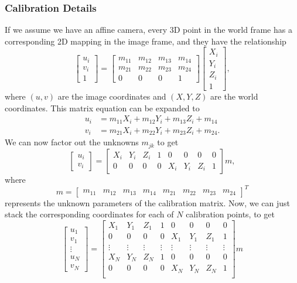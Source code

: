 \documentclass[letterpaper, 10 pt, conference]{ieeeconf}  %
\begin{document}
\subsubsection{Calibration Details}
If we assume we have an affine camera, every 3D point in the world frame has a corresponding 2D mapping in the image frame, and they have the relationship
\[
\left[\begin{array}{c}u_i \\v_i \\1\end{array}\right] =  
\left[\begin{array}{cccc}
m_{11} & m_{12} & m_{13} & m_{14} \\
m_{21} & m_{22} & m_{23} & m_{24} \\
0 & 0 & 0 & 1\end{array}\right]
\left[\begin{array}{c}X_i\\Y_i\\Z_i\\1\end{array}\right],
\]
where $(u,v)$ are the image coordinates and $(X,Y,Z)$ are the world coordinates.
This matrix equation can be expanded to
\begin{align*}
u_i &= m_{11}X_i + m_{12} Y_i + m_{13}Z_i + m_{14}\\
v_i &= m_{21}X_i + m_{22} Y_i + m_{23}Z_i + m_{24}.
\end{align*}
We can now factor out the unknowns $m_{jk}$ to get
\[
\left[\begin{array}{c}u_i \\v_i\end{array}\right] =  
\left[\begin{array}{cccccccc}
X_i & Y_i & Z_i & 1 & 0 & 0 & 0 & 0 \\
0 & 0 & 0 & 0 & X_i & Y_i & Z_i & 1 \end{array}\right]
m,
\]
where 
\[m = \left[\begin{array}{cccccccc}
m_{11}& m_{12}& m_{13}& m_{14}& m_{21}&m_{22}&m_{23}& m_{24}
\end{array}\right]^T\]
 represents the unknown parameters of the calibration matrix.
Now, we can just stack the corresponding coordinates for each of $N$ calibration points, to get
\[
\left[\begin{array}{c}u_1 \\v_1 \\\vdots \\ u_N \\ v_N\end{array}\right]=
\left[\begin{array}{cccccccc}
X_1 & Y_1 & Z_1 & 1 & 0 & 0 & 0 & 0 \\
0 & 0 & 0 & 0 & X_1 & Y_1 & Z_1 & 1 \\
\vdots  & \vdots  & \vdots  & \vdots   & \vdots &\vdots &\vdots &\vdots \\
X_N & Y_N & Z_N & 1 & 0 & 0 & 0 & 0 \\
0 & 0 & 0 & 0 & X_N & Y_N & Z_N & 1 \\ \end{array}\right]m
\]
\end{document}
